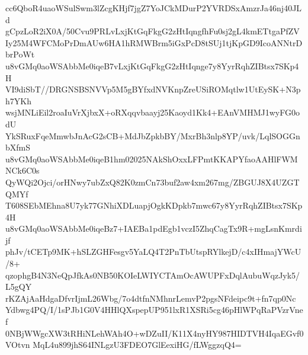 cc6QboR4uaoWSulSwm3lZcgKHjf7jgZ7YoJCkMDurP2YVRDSxAmzrJa46nj40JLd
gCpzLoR2iX0A/50Cvu9PRLvLxjKtGqFkgG2zHtIqngfhFu0sj2gL4kmETtgaPfZV
Iy25M4WFCMoPrDmAUw6HA1hRMWBrm5iGxPcD8tSUj1tjKpGD9IcoANNtrDbrPoWt
u8vGMq0aoWSAbbMe0iqeB7vLxjKtGqFkgG2zHtIqnge7y8YyrRqhZIBtsx7SKp4H
VI9diSbT//DRGNSBSNVVp5M5gBYfxdNVKnpZreUSiROMqtlw1UtEySK+N3ph7YKh
wsjMNLiEil2roaIuVrXjbxX+oRXqqvbaayj25Kaoyd1Kk4+EAnVMHMJ1wyFG0odU
YkSRuxFqeMmwbJnAcG2sCB+MdJbZpkbBY/MxrBh3nlp8YP/uvk/LqlSOGGnbXfmS
u8vGMq0aoWSAbbMe0iqeB1hm02025NAkShOxxLFPmtKKAPYfaoAAHlFWMNCk6C0s
QyWQi2Ojci/orHNwy7ubZxQ82K0zmCn73buf2aw4xm267mg/ZBGUJ8X4UZGTQMYf
T608SEbMEhna8U7yk77GNhiXDLuapjOgkKDpkb7mwc67y8YyrRqhZIBtsx7SKp4H
u8vGMq0aoWSAbbMe0iqeBz7+IAEBa1pdEgb1vczI5ZhqCagTx9R+mgLsnKmrdijf
phJv/tCETp9MK+hSLZGHFesgv5YaLQ4T2PnTbUtspRYlkejD/c4xIHmajYWcU/8+
qzophgB4N3NeQpJfkAs0NB50KOIeLWIYCTAmOcAWUPFxDqlAubuWqzJyk5/L5gQY
rKZAjAaHdgaDfvrIjmL26Wbg/7o4dtfnNMhnrLemvP2pgsNFdeipc9t+fn7qp0Nc
Ydbwg4PQ/I/1sPJb1G0V4HHlQXspepUP951lxR1XSRi5cg46pHlWPqRaPVzrVnef
0NBjWWgcXW3tRHiNLehWAh4O+wDZuII/K11X4nyHY987HIDTVH4IqaEGvf0VOtvn
MqL4u899jhS64INLgzU3FDEO7GlEexiHG/fLWggzqQ4=
